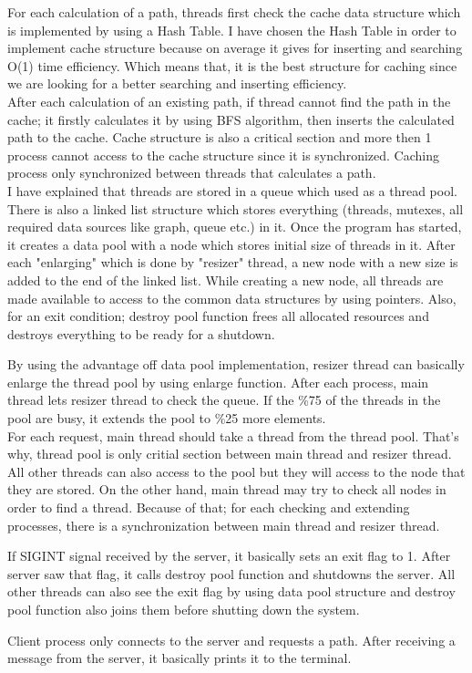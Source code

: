 \documentclass[12pt, a4paper]{article}
\begin{document}
\justify
	For each calculation of a path, threads first check the cache data structure which is implemented by using a Hash Table. I have chosen the Hash Table in order to implement cache structure because on average it gives for inserting and searching O(1) time efficiency. Which means that, it is the best structure for caching since we are looking for a better searching and inserting efficiency. \\
	
	After each calculation of an existing path, if thread cannot find the path in the cache;
	it firstly calculates it by using BFS algorithm, then inserts the calculated path to the cache. Cache structure is also a critical section and more then 1 process cannot access to the cache structure since it is synchronized. Caching process only synchronized between threads that calculates a path.\\

\justify
    I have explained that threads are stored in a queue which used as a thread pool. There is also a linked list structure which stores everything (threads, mutexes, all required data sources like graph, queue etc.) in it. Once the program has started, it creates a data pool with a node which stores initial size of threads in it. After each "enlarging" which is done by "resizer" thread, a new node with a new size is added to the end of the linked list. While creating a new node, all threads are made available to access to the common data structures by using pointers. Also, for an exit condition; destroy pool function frees all allocated resources and destroys everything to be ready for a shutdown.
    
\justify
By using the advantage off data pool implementation, resizer thread can basically enlarge the thread pool by using enlarge function. After each process, main thread lets resizer thread to check the queue. If the \%75 of the threads in the pool are busy, it extends the pool to \%25 more elements.\\
For each request, main thread should take a thread from the thread pool. That's why, thread pool is only critial section between main thread and resizer thread. All other threads can also access to the pool but they will access to the node that they are stored. On the other hand, main thread may try to check all nodes in order to find a thread. Because of that; for each checking and extending processes, there is a synchronization between main thread and resizer thread.

\justify
If SIGINT signal received by the server, it basically sets an exit flag to 1. After server saw that flag, it calls destroy pool function and shutdowns the server. All other threads can also see the exit flag by using data pool structure and destroy pool function also joins them before shutting down the system.

\justify
Client process only connects to the server and requests a path. After receiving a message from the server, it basically prints it to the terminal.
\end{document}
